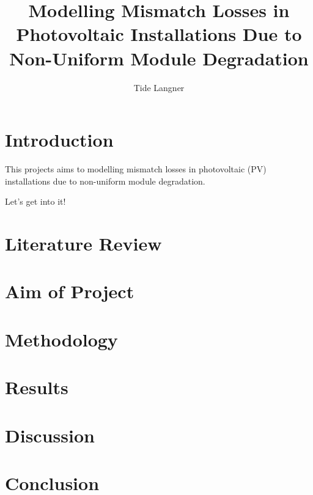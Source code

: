 \documentclass[11pt]{report}
\title{Modelling Mismatch Losses in Photovoltaic Installations Due to Non-Uniform Module Degradation}
\author{Tide Langner}
\begin{document}
\maketitle
\tableofcontents

\chapter{Introduction}\label{ch:introduction}

This projects aims to modelling mismatch losses in photovoltaic (PV)
installations due to non-uniform module degradation.

Let's get into it!

\chapter{Literature Review}\label{ch:literature-review}

\chapter{Aim of Project}\label{ch:aim-of-project}

\chapter{Methodology}\label{ch:methodology}

\chapter{Results}\label{ch:results}

\chapter{Discussion}\label{ch:discussion}

\chapter{Conclusion}\label{ch:conclusion}
\end{document}

